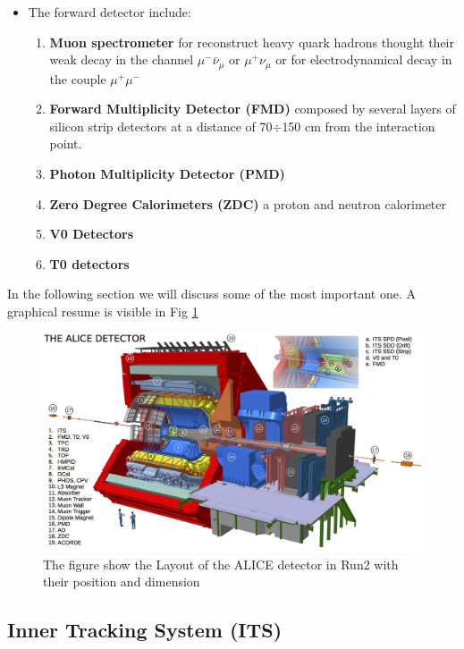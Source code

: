 \documentclass[12pt,a4paper]{book}
\begin{document}
\begin{itemize}
		\item 	The forward detector include:
		\begin{enumerate}
			\item \textbf{Muon spectrometer} for reconstruct heavy quark hadrons thought their weak decay in the channel $\mu^- \bar{\nu}_\mu$ or $\mu^+ \nu_\mu$  or for electrodynamical decay in the couple $\mu^+ \mu^-$
			\item \textbf{Forward Multiplicity Detector (FMD)} composed by several layers of silicon strip detectors at a distance of 70$\div$150 cm from the interaction point.
			\item \textbf{Photon Multiplicity Detector (PMD)}
			\item \textbf{Zero Degree Calorimeters (ZDC)} a proton and neutron calorimeter
			\item \textbf{V0 Detectors}
			\item \textbf{T0 detectors}
		\end{enumerate}
	\end{itemize}
	\cite{Padhan:2924203} \cite{Arata:2922803}
	
	In the following section we will discuss some of the most important one. A graphical resume is visible in Fig \ref{fig:ALICE_instruments}
	\begin{figure}[h]
		\centering
		\includegraphics[width=1\textwidth]{pictures/ALICE_instruments.png}
		\caption{The figure show the Layout of the ALICE detector in Run2 with their position and dimension \cite{Botta:2017bwj}}
		\label{fig:ALICE_instruments}
	\end{figure}
	
\FloatBarrier	
\subsection{Inner Tracking System (ITS)}
\end{document}
